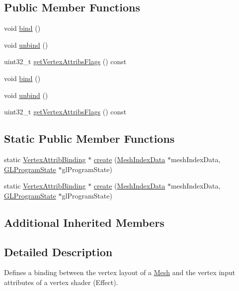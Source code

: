 \subsection*{Public Member Functions}
\begin{DoxyCompactItemize}
\item 
void \hyperlink{classVertexAttribBinding_a73d048fbb2ca9b0450b24c68024755d0}{bind} ()
\item 
void \hyperlink{classVertexAttribBinding_ab1b0ab9b2c5719b0558c460f266b9109}{unbind} ()
\item 
uint32\+\_\+t \hyperlink{classVertexAttribBinding_a686c067940b41b7db64d5103dc624799}{get\+Vertex\+Attribs\+Flags} () const
\item 
void \hyperlink{classVertexAttribBinding_a73d048fbb2ca9b0450b24c68024755d0}{bind} ()
\item 
void \hyperlink{classVertexAttribBinding_ab1b0ab9b2c5719b0558c460f266b9109}{unbind} ()
\item 
uint32\+\_\+t \hyperlink{classVertexAttribBinding_a686c067940b41b7db64d5103dc624799}{get\+Vertex\+Attribs\+Flags} () const
\end{DoxyCompactItemize}
\subsection*{Static Public Member Functions}
\begin{DoxyCompactItemize}
\item 
static \hyperlink{classVertexAttribBinding}{Vertex\+Attrib\+Binding} $\ast$ \hyperlink{classVertexAttribBinding_a9be9594764bc5cad1def711385dbb278}{create} (\hyperlink{classMeshIndexData}{Mesh\+Index\+Data} $\ast$mesh\+Index\+Data, \hyperlink{classGLProgramState}{G\+L\+Program\+State} $\ast$gl\+Program\+State)
\item 
static \hyperlink{classVertexAttribBinding}{Vertex\+Attrib\+Binding} $\ast$ \hyperlink{classVertexAttribBinding_ac0efc7ff6cca54db2e47d06db969ceeb}{create} (\hyperlink{classMeshIndexData}{Mesh\+Index\+Data} $\ast$mesh\+Index\+Data, \hyperlink{classGLProgramState}{G\+L\+Program\+State} $\ast$gl\+Program\+State)
\end{DoxyCompactItemize}
\subsection*{Additional Inherited Members}


\subsection{Detailed Description}
Defines a binding between the vertex layout of a \hyperlink{classMesh}{Mesh} and the vertex input attributes of a vertex shader (Effect).

